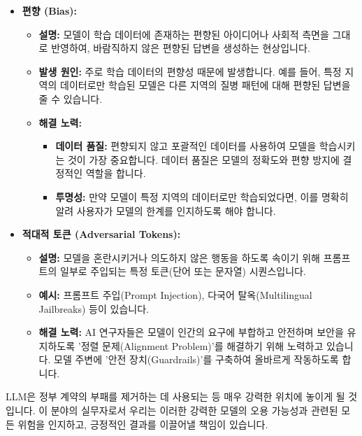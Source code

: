 \documentclass[11pt,a4paper]{article}
\begin{document}
\begin{itemize}
    \item \textbf{편향 (Bias):}
    \begin{itemize}
        \item \textbf{설명:} 모델이 학습 데이터에 존재하는 편향된 아이디어나 사회적 측면을 그대로 반영하여, 바람직하지 않은 편향된 답변을 생성하는 현상입니다.
        \item \textbf{발생 원인:} 주로 학습 데이터의 편향성 때문에 발생합니다. 예를 들어, 특정 지역의 데이터로만 학습된 모델은 다른 지역의 질병 패턴에 대해 편향된 답변을 줄 수 있습니다.
        \item \textbf{해결 노력:}
        \begin{itemize}
            \item \textbf{데이터 품질:} 편향되지 않고 포괄적인 데이터를 사용하여 모델을 학습시키는 것이 가장 중요합니다. 데이터 품질은 모델의 정확도와 편향 방지에 결정적인 역할을 합니다.
            \item \textbf{투명성:} 만약 모델이 특정 지역의 데이터로만 학습되었다면, 이를 명확히 알려 사용자가 모델의 한계를 인지하도록 해야 합니다.
        \end{itemize}
    \end{itemize}

    \item \textbf{적대적 토큰 (Adversarial Tokens):}
    \begin{itemize}
        \item \textbf{설명:} 모델을 혼란시키거나 의도하지 않은 행동을 하도록 속이기 위해 프롬프트의 일부로 주입되는 특정 토큰(단어 또는 문자열) 시퀀스입니다.
        \item \textbf{예시:} 프롬프트 주입(Prompt Injection), 다국어 탈옥(Multilingual Jailbreaks) 등이 있습니다.
        \item \textbf{해결 노력:} AI 연구자들은 모델이 인간의 요구에 부합하고 안전하며 보안을 유지하도록 '정렬 문제(Alignment Problem)'를 해결하기 위해 노력하고 있습니다. 모델 주변에 '안전 장치(Guardrails)'를 구축하여 올바르게 작동하도록 합니다.
    \end{itemize}
\end{itemize}

\begin{tcolorbox}[cautionbox={LLM의 강력함과 책임}]
    LLM은 정부 계약의 부패를 제거하는 데 사용되는 등 매우 강력한 위치에 놓이게 될 것입니다. 이 분야의 실무자로서 우리는 이러한 강력한 모델의 오용 가능성과 관련된 모든 위험을 인지하고, 긍정적인 결과를 이끌어낼 책임이 있습니다.
\end{tcolorbox}
\end{document}
